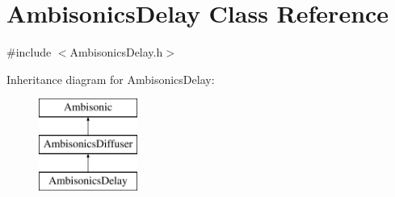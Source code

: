 \hypertarget{class_ambisonics_delay}{\section{Ambisonics\-Delay Class Reference}
\label{class_ambisonics_delay}
}


{\ttfamily \#include $<$Ambisonics\-Delay.\-h$>$}

Inheritance diagram for Ambisonics\-Delay\-:\begin{figure}[H]
\begin{center}
\leavevmode
\includegraphics[height=3.000000cm]{class_ambisonics_delay}
\end{center}
\end{figure}
